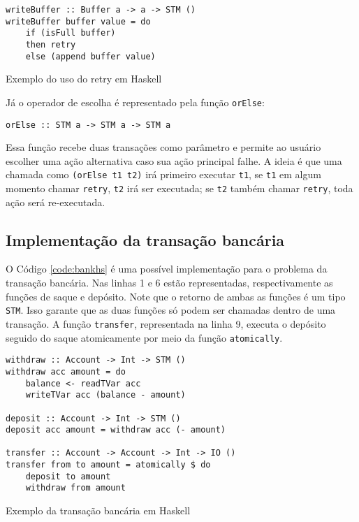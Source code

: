 \begin{listing}
  \begin{verbatim}
writeBuffer :: Buffer a -> a -> STM ()
writeBuffer buffer value = do
    if (isFull buffer)
    then retry
    else (append buffer value)
  \end{verbatim}
  \caption{Exemplo do uso do retry em Haskell}
  \label{code:retry}
\end{listing}

Já o operador de escolha é representado pela função \verb|orElse|:
\begin{verbatim}
orElse :: STM a -> STM a -> STM a
\end{verbatim}

Essa função recebe duas transações como parâmetro e permite ao usuário escolher uma ação alternativa caso sua ação principal falhe. A ideia é que uma chamada como \verb|(orElse t1 t2)| irá primeiro executar \verb|t1|, se \verb|t1| em algum momento chamar \verb|retry|, \verb|t2| irá ser executada; se \verb|t2| também chamar \verb|retry|, toda ação será re-executada.


\subsection{Implementação da transação bancária}

O Código \ref{code:bankhs} é uma possível implementação para o problema da transação bancária. Nas linhas 1 e 6 estão representadas, respectivamente as funções de saque e depósito. Note que o retorno de ambas as funções é um tipo \verb|STM|. Isso garante que as duas funções só podem ser chamadas dentro de uma transação. A função \verb|transfer|, representada na linha 9, executa o depósito seguido do saque atomicamente por meio da função \verb|atomically|.

\begin{listing}
  \begin{verbatim}
withdraw :: Account -> Int -> STM ()
withdraw acc amount = do
    balance <- readTVar acc
    writeTVar acc (balance - amount)

deposit :: Account -> Int -> STM ()
deposit acc amount = withdraw acc (- amount)

transfer :: Account -> Account -> Int -> IO ()
transfer from to amount = atomically $ do
    deposit to amount
    withdraw from amount
  \end{verbatim}
  \caption{Exemplo da transação bancária em Haskell}
  \label{code:bankhs}
\end{listing}
